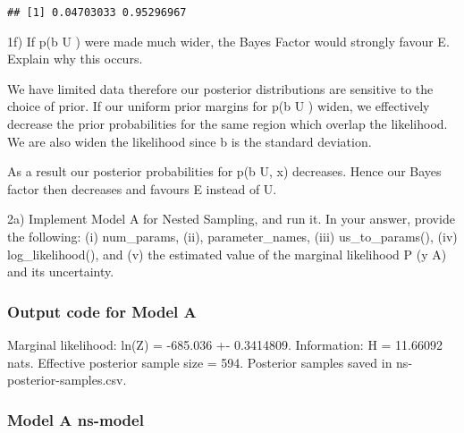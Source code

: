 \documentclass[
]{article}
\begin{document}
\begin{verbatim}
## [1] 0.04703033 0.95296967
\end{verbatim}

1f) If p(b \textbar{} U ) were made much wider, the Bayes Factor would
strongly favour E. Explain why this occurs.

We have limited data therefore our posterior distributions are sensitive
to the choice of prior. If our uniform prior margins for p(b \textbar{}
U ) widen, we effectively decrease the prior probabilities for the same
region which overlap the likelihood. We are also widen the likelihood
since b is the standard deviation.

As a result our posterior probabilities for p(b \textbar{} U, x)
decreases. Hence our Bayes factor then decreases and favours E instead
of U.

2a) Implement Model A for Nested Sampling, and run it. In your answer,
provide the following: (i) num\_params, (ii), parameter\_names, (iii)
us\_to\_params(), (iv) log\_likelihood(), and (v) the estimated value of
the marginal likelihood P (y \textbar{} A) and its uncertainty.

\hypertarget{output-code-for-model-a}{%
\subsubsection{Output code for Model A}\label{output-code-for-model-a}}

Marginal likelihood: ln(Z) = -685.036 +- 0.3414809. Information: H =
11.66092 nats. Effective posterior sample size = 594. Posterior samples
saved in ns-posterior-samples.csv.

\hypertarget{model-a-ns-model}{%
\subsubsection{Model A ns-model}\label{model-a-ns-model}}
\end{document}
